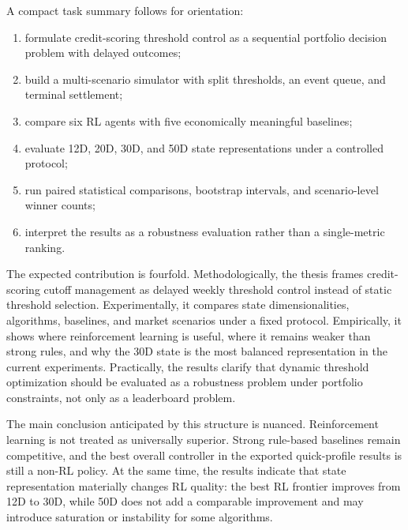 \documentclass[12pt,a4paper]{article}
\begin{document}
A compact task summary follows for orientation:
\begin{enumerate}[leftmargin=*]
    \item formulate credit-scoring threshold control as a sequential portfolio decision problem with delayed outcomes;
    \item build a multi-scenario simulator with split thresholds, an event queue, and terminal settlement;
    \item compare six RL agents with five economically meaningful baselines;
    \item evaluate 12D, 20D, 30D, and 50D state representations under a controlled protocol;
    \item run paired statistical comparisons, bootstrap intervals, and scenario-level winner counts;
    \item interpret the results as a robustness evaluation rather than a single-metric ranking.
\end{enumerate}

The expected contribution is fourfold. Methodologically, the thesis frames credit-scoring cutoff management as delayed weekly threshold control instead of static threshold selection. Experimentally, it compares state dimensionalities, algorithms, baselines, and market scenarios under a fixed protocol. Empirically, it shows where reinforcement learning is useful, where it remains weaker than strong rules, and why the 30D state is the most balanced representation in the current experiments. Practically, the results clarify that dynamic threshold optimization should be evaluated as a robustness problem under portfolio constraints, not only as a leaderboard problem.

The main conclusion anticipated by this structure is nuanced. Reinforcement learning is not treated as universally superior. Strong rule-based baselines remain competitive, and the best overall controller in the exported quick-profile results is still a non-RL policy. At the same time, the results indicate that state representation materially changes RL quality: the best RL frontier improves from 12D to 30D, while 50D does not add a comparable improvement and may introduce saturation or instability for some algorithms.

\bigskip
\noindent\setlength{\fboxsep}{10pt}%
\end{document}
